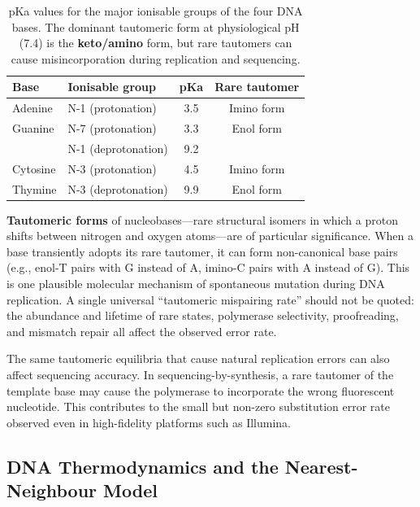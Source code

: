 \begin{table}[htbp]
\centering
\caption[Nucleobase pKa values and tautomeric equilibria.]{pKa values for the major ionisable groups of the four DNA bases. The dominant tautomeric form at physiological pH (7.4) is the \textbf{keto/amino} form, but rare tautomers can cause misincorporation during replication and sequencing.}
\label{tab:molbio:pka}
\small
\begin{tabular}{llcc}
\toprule
\textbf{Base} & \textbf{Ionisable group} & \textbf{pKa} & \textbf{Rare tautomer} \\
\midrule
Adenine & N-1 (protonation) & 3.5 & Imino form \\
Guanine & N-7 (protonation) & 3.3 & Enol form \\
        & N-1 (deprotonation) & 9.2 & \\
Cytosine & N-3 (protonation) & 4.5 & Imino form \\
Thymine  & N-3 (deprotonation) & 9.9 & Enol form \\
\bottomrule
\end{tabular}
\end{table}

\textbf{Tautomeric forms} of nucleobases---rare structural isomers in which a proton shifts between nitrogen and oxygen atoms---are of particular significance. When a base transiently adopts its rare tautomer, it can form non-canonical base pairs (e.g., enol-T pairs with G instead of A, imino-C pairs with A instead of G). This is one plausible molecular mechanism of spontaneous mutation during DNA replication. A single universal ``tautomeric mispairing rate'' should not be quoted: the abundance and lifetime of rare states, polymerase selectivity, proofreading, and mismatch repair all affect the observed error rate.

\begin{warningbox}[title={Tautomers and Sequencing Errors}]
The same tautomeric equilibria that cause natural replication errors can also affect sequencing accuracy. In sequencing-by-synthesis, a rare tautomer of the template base may cause the polymerase to incorporate the wrong fluorescent nucleotide. This contributes to the small but non-zero substitution error rate observed even in high-fidelity platforms such as Illumina.
\end{warningbox}


\subsection{DNA Thermodynamics and the Nearest-Neighbour Model}
\label{subsec:molbio:thermodynamics}

